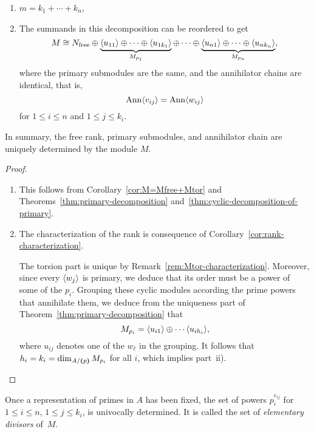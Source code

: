 \begin{thm}
\begin{enumerate}[\rm a)]
\begin{enumerate}[\rm i)]
        \item $m = k_1+\cdots+k_n$,
        
        \item The summands in this decomposition can be reordered to get
        $$
            M \cong N_{\rm free}\oplus
                \underbrace{\langle u_{11}\rangle
                    \oplus\cdots\oplus\langle u_{1k_1}\rangle
                }_{M_{p_1}}
                \oplus\cdots\oplus
                \underbrace{\langle u_{n1}\rangle
                    \oplus\cdots\oplus\langle u_{nk_n}\rangle
                }_{M_{p_n}},
        $$
        where the primary submodules are the same, and the annihilator chains are identical, that is,
        $$
            \operatorname{\operatorname{Ann}}\langle v_{ij}\rangle = \operatorname{\operatorname{Ann}}\langle w_{ij}\rangle
        $$
        for $1\le i\le n$ and\/ $1\le j\le k_i$.
    \end{enumerate}
\end{enumerate}
In summary, the free rank, primary submodules, and annihilator chain are uniquely determined by the module\/ $M$.
\end{thm}

\begin{proof}${}$
    \begin{enumerate}[\rm a)]
        \item This follows from Corollary~\ref{cor:M=Mfree+Mtor} and Theorems~\ref{thm:primary-decomposition} and~\ref{thm:cyclic-decomposition-of-primary}.

        \item The characterization of the rank is consequence of Corollary~\ref{cor:rank-characterization}.

        The torsion part is unique by Remark~\ref{rem:Mtor-characterization}. Moreover, since every $\langle w_j\rangle$ is primary, we deduce that its order must be a power of some of the $p_i$. Grouping these cyclic modules according the prime powers that annihilate them, we deduce from the uniqueness part of Theorem~\ref{thm:primary-decomposition} that
        $$
            M_{p_i}=\langle u_{i1}\rangle\oplus\cdots\langle u_{ih_i}\rangle,
        $$
        where $u_{ij}$ denotes one of the $w_\ell$ in the grouping. It follows that $h_i=k_i=\dim_{A/\textrm{\boldmath$($}p\textrm{\boldmath$)$}}M_{p_i}$ for all $i$, which implies part~ii).
    \end{enumerate}
\end{proof}

\begin{defn}
    Once a representation of primes in $A$ has been fixed, the set of powers $p_i^{e_{ij}}$ for $1\le i\le n$, $1\le j\le k_i$, is univocally determined. It is called the set of \textsl{elementary divisors} of~$M$.
\end{defn}

